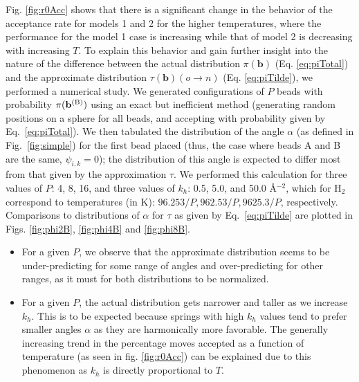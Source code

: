                 Fig. \ref{fig:r0Acc} shows that there is a significant change in the behavior of the acceptance rate for models 1 and 2 for the higher temperatures, where the performance for the model 1 case is increasing while that of model 2 is decreasing with increasing $T$. To explain this behavior and gain further insight into the nature of the difference between the actual distribution $\pi({\mathbf b})$ (Eq. \eqref{eq:piTotal}) and the approximate distribution $\tau({\mathbf b}) (o \to n)$ (Eq. \eqref{eq:piTilde}), we performed a numerical study. We generated configurations of $P$ beads with probability $\pi({\bf{b}}^{\textrm{(B)}})$ using an exact but inefficient method (generating random positions on a sphere for all beads, and accepting with probability given by Eq.~\eqref{eq:piTotal}). We then tabulated the distribution of the angle $\alpha$ (as defined in Fig.~\ref{fig:simple}) for the first bead placed (thus, the case where beads A and B are the same, $\psi_{i,k} = 0$); the distribution of this angle is expected to differ most from that given by the approximation $\tau$. We performed this calculation for three values of $P$: 4, 8, 16, and three values of $k_h$: 0.5, 5.0, and 50.0 \AA$^{-2}$, which for H$_2$ correspond to temperatures (in K): $96.253/P, 962.53/P, 9625.3/P$, respectively. Comparisons to distributions of $\alpha$ for $\tau$ as given by Eq.~\eqref{eq:piTilde}  are plotted in Figs. \ref{fig:phi2B}, \ref{fig:phi4B} and \ref{fig:phi8B}.
                \begin{itemize}
                    \item For a given $P$, we observe that the approximate distribution seems to be under-predicting for some range of angles and over-predicting for other ranges, as it must for both distributions to be normalized.
                    \item For a given $P$, the actual distribution gets narrower and taller as we increase $k_h$. This is to be expected because springs with high $k_h$ values tend to prefer smaller angles $\alpha$ as they are harmonically more favorable. The generally increasing trend in the percentage moves accepted as a function of temperature (as seen in fig. \ref{fig:r0Acc}) can be explained due to this phenomenon as $k_h$ is directly proportional to $T$.
                \end{itemize}

